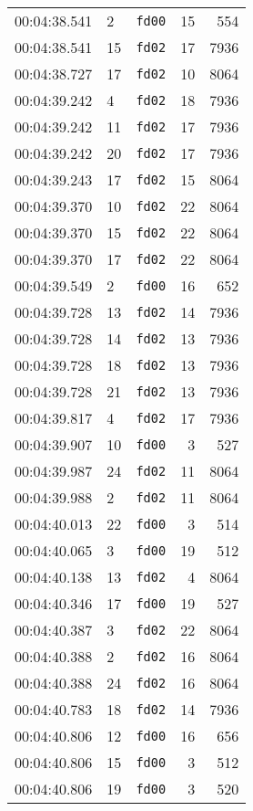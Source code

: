 \documentclass{article}
\begin{document}
\begin{longtable}{lllrr}
00:04:38.541 & 2 & \texttt{fd00} & 15 & 554 \\
00:04:38.541 & 15 & \texttt{fd02} & 17 & 7936 \\
00:04:38.727 & 17 & \texttt{fd02} & 10 & 8064 \\
00:04:39.242 & 4 & \texttt{fd02} & 18 & 7936 \\
00:04:39.242 & 11 & \texttt{fd02} & 17 & 7936 \\
00:04:39.242 & 20 & \texttt{fd02} & 17 & 7936 \\
00:04:39.243 & 17 & \texttt{fd02} & 15 & 8064 \\
00:04:39.370 & 10 & \texttt{fd02} & 22 & 8064 \\
00:04:39.370 & 15 & \texttt{fd02} & 22 & 8064 \\
00:04:39.370 & 17 & \texttt{fd02} & 22 & 8064 \\
00:04:39.549 & 2 & \texttt{fd00} & 16 & 652 \\
00:04:39.728 & 13 & \texttt{fd02} & 14 & 7936 \\
00:04:39.728 & 14 & \texttt{fd02} & 13 & 7936 \\
00:04:39.728 & 18 & \texttt{fd02} & 13 & 7936 \\
00:04:39.728 & 21 & \texttt{fd02} & 13 & 7936 \\
00:04:39.817 & 4 & \texttt{fd02} & 17 & 7936 \\
00:04:39.907 & 10 & \texttt{fd00} & 3 & 527 \\
00:04:39.987 & 24 & \texttt{fd02} & 11 & 8064 \\
00:04:39.988 & 2 & \texttt{fd02} & 11 & 8064 \\
00:04:40.013 & 22 & \texttt{fd00} & 3 & 514 \\
00:04:40.065 & 3 & \texttt{fd00} & 19 & 512 \\
00:04:40.138 & 13 & \texttt{fd02} & 4 & 8064 \\
00:04:40.346 & 17 & \texttt{fd00} & 19 & 527 \\
00:04:40.387 & 3 & \texttt{fd02} & 22 & 8064 \\
00:04:40.388 & 2 & \texttt{fd02} & 16 & 8064 \\
00:04:40.388 & 24 & \texttt{fd02} & 16 & 8064 \\
00:04:40.783 & 18 & \texttt{fd02} & 14 & 7936 \\
00:04:40.806 & 12 & \texttt{fd00} & 16 & 656 \\
00:04:40.806 & 15 & \texttt{fd00} & 3 & 512 \\
00:04:40.806 & 19 & \texttt{fd00} & 3 & 520 \\

\end{longtable}
\end{document}
